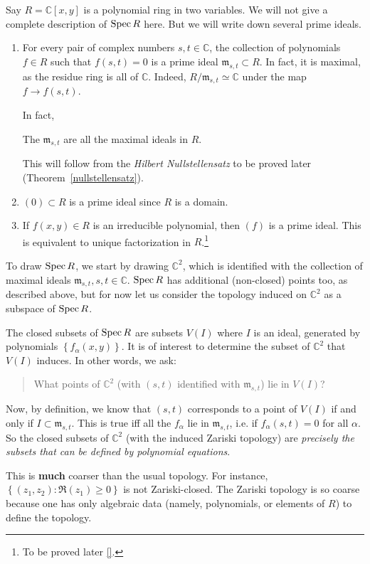 \begin{example} \label{twovarpoly}
Say $R = \mathbb{C}[x,y]$ is a polynomial ring in two variables.
We will not give a complete description of $\operatorname{Spec} R$ here. But we will write
down several
prime ideals.

\begin{enumerate}
\item For every pair of complex numbers $s,t \in \mathbb{C}$,
the collection of polynomials
$f \in R$ such that $f(s,t) = 0$ is a prime ideal $\mathfrak{m}
_{s,t} \subset R$. In
fact, it is maximal, as the residue ring is all of
$\mathbb{C}$. Indeed,
$R/\mathfrak{m}_{s,t} \simeq \mathbb{C}$ under the map $f \to
f(s,t)$.

In fact, 
\begin{theorem}
The $\mathfrak{m}_{s,t}$ are all the maximal ideals in $R$.
\end{theorem} 
This will follow from the \emph{Hilbert Nullstellensatz} to be
proved later
(Theorem~\ref{nullstellensatz}).
\item $(0) \subset R$ is a prime ideal since $R$ is a domain. 
\item If $f(x,y) \in R$ is an irreducible polynomial, then $(f)$
is a prime
ideal. This is equivalent to unique factorization in
$R$.\footnote{To be
proved later \ref{}.}  
\end{enumerate}

To draw $\operatorname{Spec} R$, we start by drawing $\mathbb{C}^2$, which is identified
with the
collection of
maximal ideals $\mathfrak{m}_{s,t}, s, t \in \mathbb{C}$. $\operatorname{Spec} R$ has additional (non-closed) points
too, as
described above, but for now let us
consider the topology induced on $\mathbb{C}^2$ as a subspace of
$\operatorname{Spec} R$.

The closed subsets of $\operatorname{Spec} R$ are subsets $V(I)$ where $I$ is
an ideal,
generated by polynomials $\left\{f_{\alpha}(x,y)\right\}$. It is of interest to determine the subset of $\mathbb{C}^2$ that
$V(I)$
induces. In other words, we ask:
\begin{quote}
What points of $\mathbb{C}^2$ (with $(s,t)$ identified with
$\mathfrak{m}_{s,t}$) lie in $V(I)$?
\end{quote}
Now, by definition, we know that $(s,t)$ corresponds to a point of $V(I)$ if and
only if $I
\subset \mathfrak{m}_{s,t}$.
This is true iff all the
$f_{\alpha} $ lie in $ \mathfrak{m}_{s,t}$, i.e. if
$f_{\alpha}(s,t) =0$ for all
$\alpha$. So the closed subsets of $\mathbb{C}^2$ (with the
induced Zariski
topology) are \emph{precisely the subsets
that can be defined by polynomial equations}.

This is
\textbf{much} coarser
than the usual topology. For instance, $\left\{(z_1,z_2):
\Re(z_1) \geq 0\right\}$ is
not Zariski-closed. 
The Zariski topology is so coarse because one has only algebraic
data (namely,
polynomials, or elements of $R$) to define the topology.
\end{example} 


